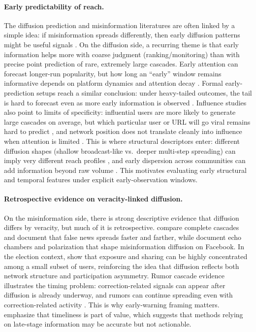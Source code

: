 \paragraph{Early predictability of reach.}
The diffusion prediction and misinformation literatures are often linked by a simple idea: if misinformation spreads differently, then early diffusion patterns might be useful signals \citep{shu_fake_2017,zubiaga_detection_2018,vosoughi_spread_2018}. On the diffusion side, a recurring theme is that early information helps more with coarse judgment (ranking/monitoring) than with precise point prediction of rare, extremely large cascades. Early attention can forecast longer-run popularity, but how long an ``early'' window remains informative depends on platform dynamics and attention decay \citep{szabo_predicting_2010}. Formal early-prediction setups reach a similar conclusion: under heavy-tailed outcomes, the tail is hard to forecast even as more early information is observed \citep{cheng_can_2014}. Influence studies also point to limits of specificity: influential users are more likely to generate large cascades on average, but which particular user or URL will go viral remains hard to predict \citep{bakshy_everyones_2011}, and network position does not translate cleanly into influence when attention is limited \citep{lerman_information_2010}. This is where structural descriptors enter: different diffusion shapes (shallow broadcast-like vs.\ deeper multi-step spreading) can imply very different reach profiles \citep{goel_structural_2016}, and early dispersion across communities can add information beyond raw volume \citep{weng_virality_2013}. This motivates evaluating early structural and temporal features under explicit early-observation windows.

 
\paragraph{Retrospective evidence on veracity-linked diffusion.}
On the misinformation side, there is strong descriptive evidence that diffusion differs by veracity, but much of it is retrospective. \citet{vosoughi_spread_2018} compare complete cascades and document that false news spreads faster and farther, while \citet{del_vicario_spreading_2016} document echo chambers and polarization that shape misinformation diffusion on Facebook. In the election context, \citet{grinberg_fake_2019} show that exposure and sharing can be highly concentrated among a small subset of users, reinforcing the idea that diffusion reflects both network structure and participation asymmetry. Rumor cascade evidence illustrates the timing problem: correction-related signals can appear after diffusion is already underway, and rumors can continue spreading even with correction-related activity \citep{friggeri_rumor_2014}. This is why early-warning framing matters. \citet{colbaugh_earlywarning_2012} emphasize that timeliness is part of value, which suggests that methods relying on late-stage information may be accurate but not actionable.

